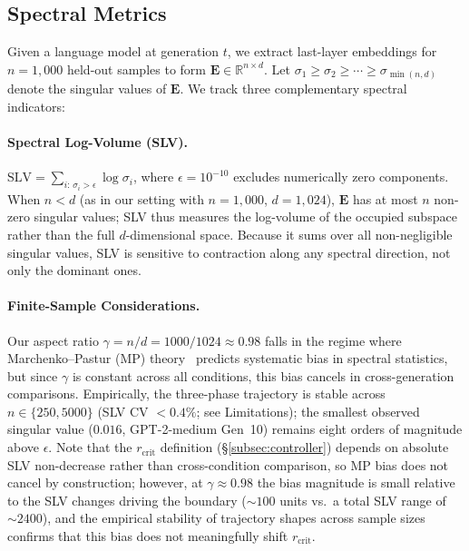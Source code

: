 \subsection{Spectral Metrics}
\label{subsec:spectral_metrics}

Given a language model at generation $t$, we extract last-layer embeddings for $n{=}1{,}000$ held-out samples to form $\mathbf{E} \in \mathbb{R}^{n \times d}$.
Let $\sigma_1 \geq \sigma_2 \geq \cdots \geq \sigma_{\min(n,d)}$ denote the singular values of $\mathbf{E}$.
We track three complementary spectral indicators:

\paragraph{Spectral Log-Volume (SLV).}
$\text{SLV} = \sum_{i:\,\sigma_i > \epsilon} \log \sigma_i$, where $\epsilon = 10^{-10}$ excludes numerically zero components.
When $n < d$ (as in our setting with $n{=}1{,}000$, $d{=}1{,}024$), $\mathbf{E}$ has at most $n$ non-zero singular values; SLV thus measures the log-volume of the occupied subspace rather than the full $d$-dimensional space.
Because it sums over all non-negligible singular values, SLV is sensitive to contraction along any spectral direction, not only the dominant ones.

\paragraph{Finite-Sample Considerations.}
Our aspect ratio $\gamma = n/d = 1000/1024 \approx 0.98$ falls in the regime where Marchenko--Pastur (MP) theory~\citep{bai2010spectral} predicts systematic bias in spectral statistics, but since $\gamma$ is constant across all conditions, this bias cancels in cross-generation comparisons.
Empirically, the three-phase trajectory is stable across $n \in \{250, 5000\}$ (SLV CV $< 0.4\%$; see Limitations); the smallest observed singular value ($0.016$, GPT-2-medium Gen~10) remains eight orders of magnitude above $\epsilon$.
Note that the $r_{\text{crit}}$ definition (\S\ref{subsec:controller}) depends on absolute SLV non-decrease rather than cross-condition comparison, so MP bias does not cancel by construction; however, at $\gamma \approx 0.98$ the bias magnitude is small relative to the SLV changes driving the boundary (${\sim}100$ units vs.\ a total SLV range of ${\sim}2400$), and the empirical stability of trajectory shapes across sample sizes confirms that this bias does not meaningfully shift $r_{\text{crit}}$.


